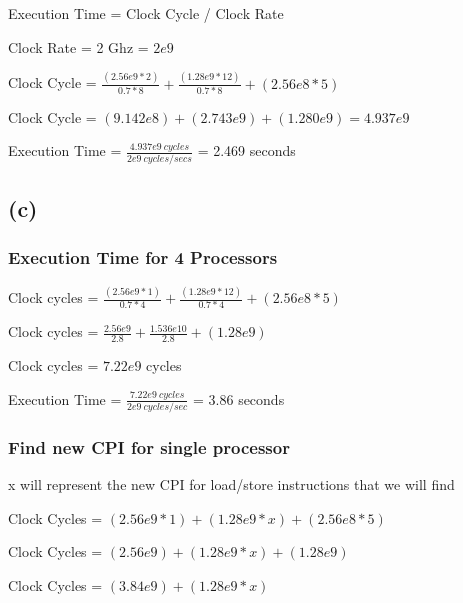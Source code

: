 \documentclass{article}
\begin{document}
    Execution Time = Clock Cycle / Clock Rate

    Clock Rate = 2 Ghz = $2e9$
    \vspace*{6pt}

    Clock Cycle = $\frac{(2.56e9 * 2)}{0.7 * 8} + \frac{(1.28e9 * 12)}{0.7 * 8} + (2.56e8 * 5)$
    \vspace*{6pt}

    Clock Cycle = $(9.142e8) + (2.743e9) + (1.280e9) = 4.937e9$
    \vspace*{6pt}

    Execution Time = $\frac{4.937e9\ cycles}{2e9\ cycles/secs}$ = 2.469 seconds

    \subsection*{(c)}

    \subsubsection*{Execution Time for 4 Processors}

    Clock cycles = $\frac{(2.56e9 * 1)}{0.7 * 4} + \frac{(1.28e9 * 12)}{0.7*4} + (2.56e8 * 5)$

    \vspace*{6pt}

    Clock cycles = $\frac{2.56e9}{2.8} + \frac{1.536e{10}}{2.8} + (1.28e9) $
    
    \vspace*{6pt}

    Clock cycles = $7.22e9$ cycles
    \vspace*{6pt}
    
    Execution Time = $\frac{7.22e9\ cycles}{2e9\ cycles/sec}$ = 3.86 seconds

    \subsubsection*{Find new CPI for single processor}

    x will represent the new CPI for load/store instructions that we will find

    Clock Cycles = $(2.56e9 * 1) + (1.28e9 * x) + (2.56e8 * 5)$

    Clock Cycles = $(2.56e9) + (1.28e9 * x) + (1.28e9)$

    Clock Cycles = $(3.84e9) + (1.28e9 * x)$
    \vspace*{6pt}
\end{document}
